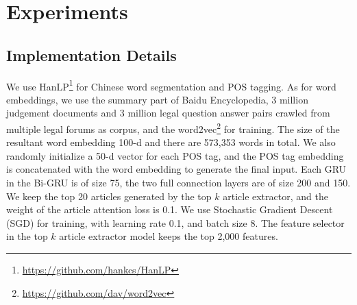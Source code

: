 \section{Experiments}
\subsection{Implementation Details}
We use HanLP\footnote{\url{https://github.com/hankcs/HanLP}} for Chinese word segmentation and POS tagging. 
As for word embeddings, we use the summary part of Baidu Encyclopedia, 3 million judgement documents and 3 million legal question answer pairs crawled from multiple legal forums as corpus, and the word2vec\footnote{\url{https://github.com/dav/word2vec}} for training. 
The size of the resultant word embedding 100-d and there are 573,353 words in total. 
We also randomly initialize a 50-d vector for each POS tag, and the POS tag embedding is concatenated with the word embedding to generate the final input. 
Each GRU in the Bi-GRU is of size 75, the two full connection layers are of size 200 and 150.
We keep the top 20 articles generated by the top $k$ article extractor, and the weight of the article attention loss is 0.1. 
We use Stochastic Gradient Descent (SGD) for training, with learning rate 0.1, and batch size 8.
The feature selector in the top $k$ article extractor model keeps the top 2,000 features.


